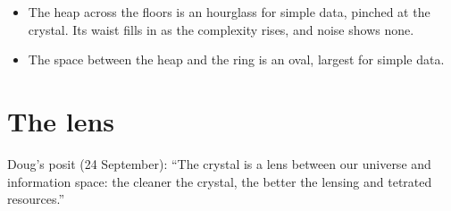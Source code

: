 \begin{itemize}
\begin{itemize}
\item The heap across the floors is an hourglass for simple data, pinched at the crystal. Its waist fills in as the complexity rises, and noise shows none.
\item The space between the heap and the ring is an oval, largest for simple data.
\end{itemize}
\end{itemize}

\section{\texorpdfstring{The lens}{The lens}}

Doug's posit (24 September): “The crystal is a lens between our universe and information space: the cleaner the crystal, the better the lensing and tetrated resources.”

